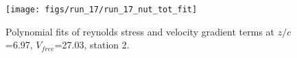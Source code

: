\begin{figure}[H]
\centering
\texttt{[image: figs/run\_17/run\_17\_nut\_tot\_fit]}
\caption{Polynomial fits of reynolds stress and velocity gradient terms at $z/c$=6.97, $V_{free}$=27.03, station 2.}
\label{fig:run_17_nut_tot_fit}
\end{figure}


